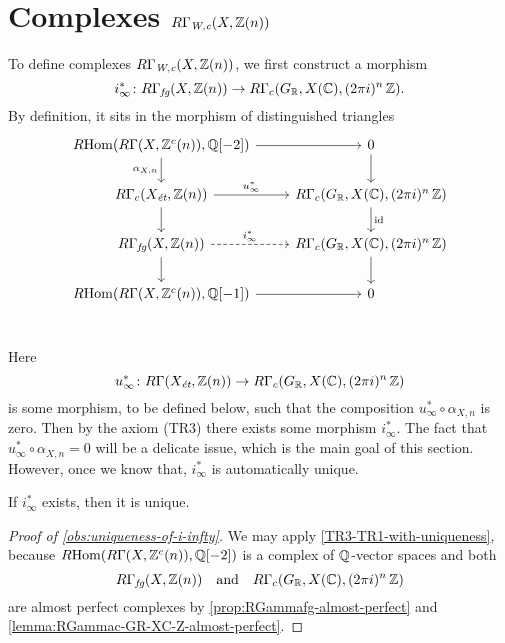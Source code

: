 
\section{Complexes
  \texorpdfstring{$R\Gamma_\text{\it W,c} (X, \mathbb{Z} (n))$}{RΓ\_W,c (X,Z(n))}}
\label{section:RGammaWc}

To define complexes $R\Gamma_\text{\it W,c} (X, \mathbb{Z} (n))$, we first construct a
morphism
\[ i_\infty^*\colon
  R\Gamma_\text{\it fg} (X, \mathbb{Z} (n)) \to
  R\Gamma_c (G_{\mathbb{R}}, X (\mathbb{C}), (2\pi i)^n\,\mathbb{Z}). \]
By definition, it sits in the morphism of distinguished triangles
\begin{equation}
  \label{eqn:triangle-defining-i-infty}
  \begin{tikzcd}
    \RHom (R\Gamma (X, \ZZ^c (n)), \QQ [-2]) \ar{d}[swap]{\alpha_{X,n}}\ar{r} & 0\ar{d} \\
    R\Gamma_c (X_\text{\it ét}, \ZZ (n)) \ar{r}{u_\infty^*}\ar{d} &  R\Gamma_c (G_\RR, X (\CC), (2\pi i)^n\,\ZZ) \ar{d}{\idid} \\
    R\Gamma_\text{\it fg} (X, \ZZ (n)) \ar[dashed]{r}{i_\infty^*}\ar{d} & R\Gamma_c (G_\RR, X (\CC), (2\pi i)^n\,\ZZ) \ar{d} \\
    \RHom (R\Gamma (X, \ZZ^c (n)), \QQ [-1])\ar{r} & 0 \\
  \end{tikzcd}
\end{equation}

Here
\[ u_\infty^*\colon
  R\Gamma (X_\text{\it ét}, \mathbb{Z} (n)) \to
  R\Gamma_c (G_{\mathbb{R}}, X (\mathbb{C}), (2\pi i)^n\,\mathbb{Z}) \]
is some morphism, to be defined below, such that the composition
$u_\infty^*\circ \alpha_{X,n}$ is zero. Then by the axiom (TR3) there exists
some morphism $i_\infty^*$. The fact that $u_\infty^*\circ \alpha_{X,n} = 0$
will be a delicate issue, which is the main goal of this section. However, once
we know that, $i_\infty^*$ is automatically unique.

\begin{observation}
  \label{obs:uniqueness-of-i-infty}
  If $i_\infty^*$ exists, then it is unique.
\end{observation}

\begin{proof}[Proof of \ref{obs:uniqueness-of-i-infty}]
  We may apply \ref{TR3-TR1-with-uniqueness}, because
  $R\!\operatorname{Hom} (R\Gamma (X, \mathbb{Z}^c (n)), \mathbb{Q} [-2])$ is a complex of $\mathbb{Q}$-vector spaces
  and both
  \[ R\Gamma_\text{\it fg} (X, \mathbb{Z} (n))
    \quad\text{and}\quad
    R\Gamma_c (G_{\mathbb{R}}, X (\mathbb{C}), (2\pi i)^n\,\mathbb{Z}) \]
  are almost perfect complexes by \ref{prop:RGammafg-almost-perfect} and
  \ref{lemma:RGammac-GR-XC-Z-almost-perfect}.
\end{proof}

